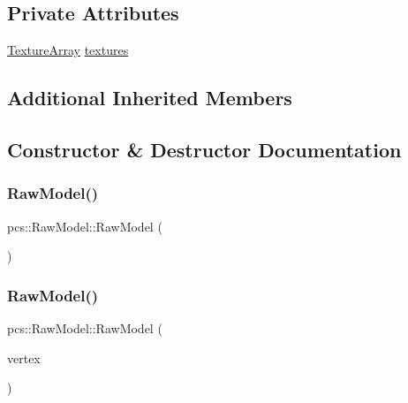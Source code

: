 \subsection*{Private Attributes}
\begin{DoxyCompactItemize}
\item 
\hyperlink{unionpcs_1_1TextureArray}{Texture\+Array} \hyperlink{classpcs_1_1RawModel_a5441811d19297669eefdb405ea94ce0c}{textures}
\end{DoxyCompactItemize}
\subsection*{Additional Inherited Members}


\subsection{Constructor \& Destructor Documentation}
\mbox{\label{classpcs_1_1RawModel_a79a06ab99e5e7438ad61c68601e9e7ea}} 
\subsubsection{\texorpdfstring{Raw\+Model()}{RawModel()}\hspace{0.1cm}{\footnotesize\ttfamily [1/2]}}
{\footnotesize\ttfamily pcs\+::\+Raw\+Model\+::\+Raw\+Model (\begin{DoxyParamCaption}{ }\end{DoxyParamCaption})\hspace{0.3cm}{\ttfamily [inline]}}

\mbox{\label{classpcs_1_1RawModel_addb04fed9a364e9c24b8b4f4b69480a7}} 
\subsubsection{\texorpdfstring{Raw\+Model()}{RawModel()}\hspace{0.1cm}{\footnotesize\ttfamily [2/2]}}
{\footnotesize\ttfamily pcs\+::\+Raw\+Model\+::\+Raw\+Model (\begin{DoxyParamCaption}\item[{const \hyperlink{classpcs_1_1VertexArray}{Vertex\+Array} \&}]{vertex }\end{DoxyParamCaption})}

